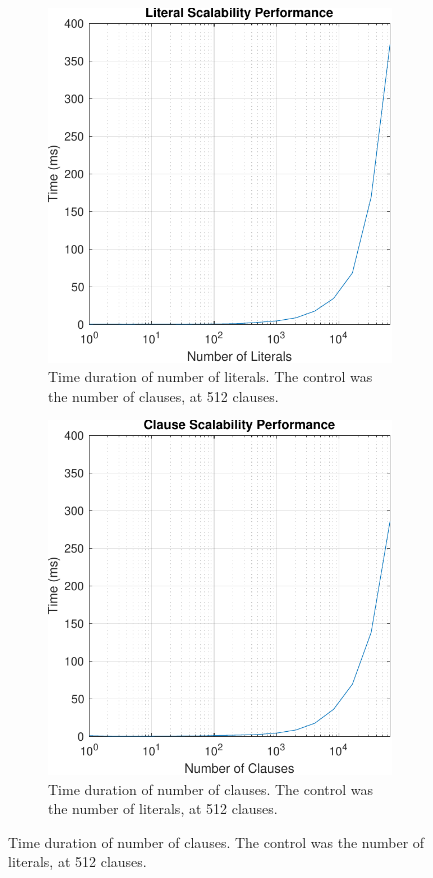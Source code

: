 \documentclass[runningheads]{llncs}
\begin{document}
\begin{figure}[h]
\begin{subfigure}{0.5\columnwidth}
    \centering
    \includegraphics[width=1\textwidth]{Figures/literal_perf.pdf}%
    \caption{Time duration of number of literals. The control was the number of clauses, at 512 clauses.}
    \label{fig:literal_perf}
\end{subfigure}
\hfill
\begin{subfigure}{0.5\columnwidth}
    \centering
    \includegraphics[width=1\textwidth]{Figures/clause_perf.pdf}%
    \caption{Time duration of number of clauses. The control was the number of literals, at 512 clauses.}
    \label{fig:clause_perf}
\end{subfigure}
\end{figure}
\end{document}
